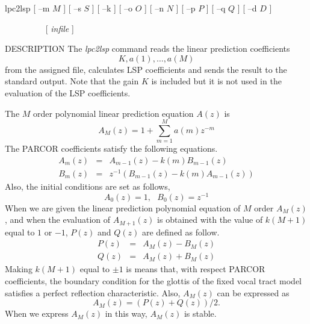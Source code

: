 
\begin{synopsis}
\item [lpc2lsp] [ --m $M$ ] [ --s $S$ ] [ --k ] [ --o $O$ ] [ --n $N$ ]
		[ --p $P$ ] [ --q $Q$ ] [ --d $D$ ] 
\item [\ ~~~~~~~~] [ {\em infile} ] 
\end{synopsis}

\begin{qsection}{DESCRIPTION}
The {\em lpc2lsp} command reads the linear prediction coefficients
\begin{displaymath}
  K, a(1), \ldots, a(M)
\end{displaymath}
from the assigned file, calculates LSP coefficients and
sends the result to the standard output.
Note that the gain $K$ is included but it is not used
in the evaluation of the LSP coefficients.
\par
The $M$ order polynomial linear prediction equation $A(z)$ is
\begin{displaymath}
  A_M(z) = 1 + \sum_{m=1}^M a(m) z^{-m}
\end{displaymath}
The PARCOR coefficients satisfy the following equations.
\begin{eqnarray*}
  A_m(z) &=& A_{m-1}(z) - k(m) B_{m-1}(z) \\
  B_m(z) &=& z^{-1} (B_{m-1}(z) - k(m) A_{m-1}(z))
\end{eqnarray*}
Also, the initial conditions are set as follows,
\begin{displaymath}
  A_0(z) = 1,~~~B_0(z) = z^{-1}
\end{displaymath}
When we are given the linear prediction polynomial equation
of $M$ order $A_M(z)$, and when the evaluation of $A_{M+1}(z)$
is obtained with the value of $k(M+1)$ equal to $1$ or $-1$, 
$P(z)$ and $Q(z)$ are defined as follow.
\begin{eqnarray*}
  P(z) &=& A_M(z) - B_M(z) \\
  Q(z) &=& A_M(z) + B_M(z)
\end{eqnarray*}
Making $k(M+1)$ equal to $\pm 1$ is means that,
with respect PARCOR coefficients,
the boundary condition for the glottis of the fixed vocal tract model
satisfies a perfect reflection characteristic.
Also, $A_M(z)$ can be expressed as
\begin{displaymath}
  A_M(z) = ( P(z) + Q(z) ) / 2.
\end{displaymath}
When we express $A_M(z)$ in this way,
$A_M(z)$ is stable.

\end{qsection}
